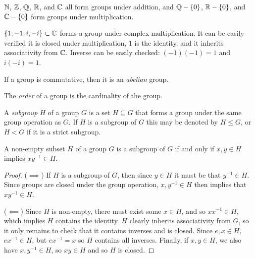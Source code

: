 \begin{exmp}
    $\mathbb{N}$, $\mathbb{Z}$, $\mathbb{Q}$, $\mathbb{R}$, and $\mathbb{C}$ all form groups under addition, and $\mathbb{Q} - \{0\}$, $\mathbb{R} - \{0\}$, and $\mathbb{C} - \{0\}$ form groups under multiplication.
\end{exmp}

\begin{exmp}
    $\{1, -1, i, -i\} \subset \mathbb{C}$ forms a group under complex multiplication. It can be easily verified it is closed under multiplication, $1$ is the identity, and it inherits associativity from $\mathbb{C}$. Inverse can be easily checked: $(-1)(-1) = 1$ and $i(-i) = 1$.
\end{exmp}

\begin{defn}
    If a group is commutative, then it is an \emph{abelian} group.
\end{defn}

\begin{defn}
    The \emph{order} of a group is the cardinality of the group.
\end{defn}

\begin{defn}
    A \emph{subgroup} $H$ of a group $G$ is a set $H \subseteq G$ that forms a group under the same group operation as $G$. If $H$ is a subgroup of $G$ this may be denoted by $H \leqslant G$, or $H < G$ if it is a strict subgroup.
\end{defn}

\begin{thm}\label{subgroup-test}
    A non-empty subset $H$ of a group $G$ is a subgroup of $G$ if and only if $x, y \in H$ implies $xy^{-1} \in H$.
\end{thm}

\begin{proof}\proofbreak
    ($\implies$) If $H$ is a subgroup of $G$, then since $y \in H$ it must be that $y^{-1} \in H$. Since groups are closed under the group operation, $x, y^{-1} \in H$ then implies that $xy^{-1} \in H$.

    ($\impliedby$) Since $H$ is non-empty, there must exist some $x \in H$, and so $xx^{-1} \in H$, which implies $H$ contains the identity. $H$ clearly inherits associativity from $G$, so it only remains to check that it contains inverses and is closed. Since $e, x \in H$, $ex^{-1} \in H$, but $ex^{-1} = x$ so $H$ contains all inverses. Finally, if $x, y \in H$, we also have $x, y^{-1} \in H$, so $xy \in H$ and so $H$ is closed.
\end{proof}

